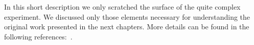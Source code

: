 In this short description we only scratched the surface of the quite complex experiment. We discussed only those elements necessary for understanding the original work presented in the next chapters. More details can be found in the following references:~\cite{Zenner2013,Afach2015falseEDM,Afach2015,Afach2014magmoment,FertlThesis,Komposch2017}.
















